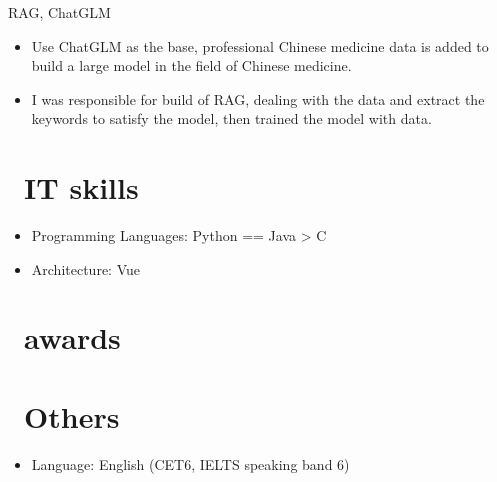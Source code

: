 \documentclass{resume}
\begin{document}
 {RAG, ChatGLM}
\begin{itemize}
  \item Use ChatGLM as the base, professional Chinese medicine data is added to build a large model in the field of Chinese medicine.
  \item I was responsible for build of RAG, dealing with the data and extract the keywords to satisfy the model, then trained the model with data.
\end{itemize}


\section{\faCogs\ IT skills}
\begin{itemize}[parsep=0.5ex]
  \item Programming Languages: Python == Java > C
  \item Architecture: Vue
\end{itemize}
\section{\faHeartO\ awards}

\section{\faInfo\ Others}
\begin{itemize}[parsep=0.5ex]
  \item Language: English (CET6, IELTS speaking band 6)
\end{itemize}
%
%
\end{document}
